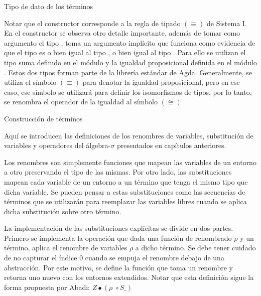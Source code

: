 \begin{codigo}
	Tipo de dato de los términos
	
\end{codigo}

Notar que el constructor \const{$[\_]\equiv\_$} corresponde a la regla de tipado $(\equiv)$ de Sistema I.
En el constructor \const{$\pi$} se observa otro detalle importante, además de tomar como argumento el tipo , toma un argumento implícito que funciona como evidencia de que el tipo  es o bien igual al tipo , o bien igual al tipo .
Para ello se utilizan el tipo suma \type{$\_\uplus\_$} definido en el módulo  y la igualdad proposicional \type{$\_\cong\_$} definida en el módulo .
Estos dos tipos forman parte de la librería estándar de Agda.
Generalmente, se utiliza el símbolo $(\equiv)$ para denotar la igualdad proposicional, pero en ese caso, ese símbolo se utilizará para definir los isomorfismos de tipos, por lo tanto, se renombra el operador de la igualdad al símbolo $(\cong)$

\begin{example}
	Construcción de términos
\end{example}

Aquí se introducen las definiciones de los renombres de variables, substitución de variables y operadores del álgebra-$\sigma$ presentados en capítulos anteriores.


Los renombres son simplemente funciones que mapean las variables de un entorno a otro preservando el tipo de las mismas.
Por otro lado, las substituciones mapean cada variable de un entorno a un término que tenga el mismo tipo que dicha variable.
Se pueden pensar a estas substituciones como las secuencias de términos que se utilizarán para reemplazar las variables libres cuando se aplica dicha substitución sobre otro término. 

La implementación de las substituciones explícitas se divide en dos partes.
Primero se implementa la operación  que dada una función de renombrado $\rho$ y un término, aplica el renombre de variables $\rho$ a dicho término.
Se debe tener cuidado de no capturar el índice 0 cuando se empuja el renombre debajo de una abstracción.
Por este motivo, se define la función  que toma un renombre y retorna uno nuevo con los entornos extendidos.
Notar que esta definición sigue la forma propuesta por Abadi: $Z \bullet (\rho \; \circ S\_)$

